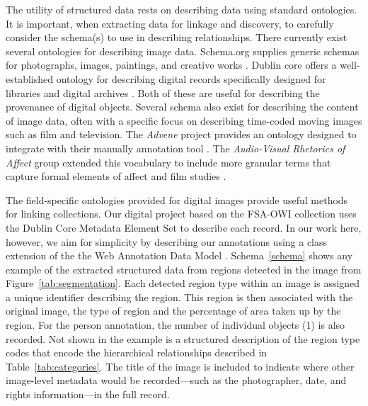 \documentclass[10pt, a4paper]{article}
\begin{document}
The utility of structured data rests on describing data using standard
ontologies. It is important, when extracting data for linkage and discovery,
to carefully consider the schema(s) to use in describing relationships. There
currently exist several ontologies for describing image data. Schema.org
supplies generic schemas for photographs, images, paintings, and creative works
\cite{guha2016schema}. Dublin core offers a well-established ontology for
describing digital records specifically designed for libraries and digital
archives \cite{weibel1997dublin}. Both of these are useful for describing the
provenance of digital objects. Several schema also exist for describing the
content of image data, often with a specific focus on describing time-coded
moving images such as film and television. The \textit{Advene} project provides
an ontology designed to integrate with their manually annotation
tool \cite{aubert2005advene}. The \textit{Audio-Visual Rhetorics of Affect}
group extended this vocabulary to include more granular terms that capture
formal elements of affect and film studies \cite{agt2018semantic}.

The field-specific ontologies provided for digital images provide useful
methods for linking collections. Our digital project based on the FSA-OWI
collection uses the Dublin Core Metadata Element Set to describe each record.
In our work here, however, we aim for simplicity by describing our annotations
using a class extension of the the Web Annotation Data Model \cite{w3c}.
Schema~\ref{schema} shows any example of the extracted structured data from
regions detected in the image from Figure~\ref{tab:segmentation}. Each detected
region type within an image is assigned a unique identifier describing the
region. This region is then associated with the original image, the type of
region and the percentage of area taken up by the region. For the person
annotation, the number of individual objects (1) is also recorded. Not shown
in the example is a structured description of the region type codes that
encode the hierarchical relationships described in Table~\ref{tab:categories}.
The title of the image is included to indicate where other image-level metadata
would be recorded---such as the photographer, date, and rights information---in
the full record.
\end{document}
